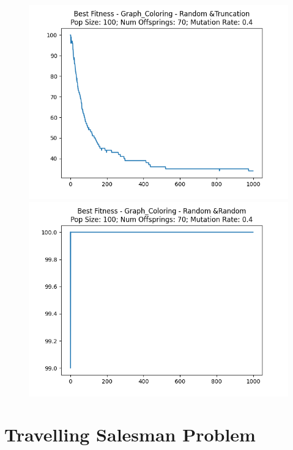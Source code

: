 \documentclass[12pt]{report}
\theoremstyle{mytheoremstyle}
\theoremstyle{mytheoremstyle}
\theoremstyle{myproblemstyle}
\begin{document}
\begin{figure}[!]
\begin{minipage}{0.4\textwidth}
		\includegraphics[width=\linewidth]{../Analysis/BSF_Graph_Coloring_4_3_100_70.png}
	\end{minipage}
	\hspace{\fill}
	\begin{minipage}{0.4\textwidth}
		\includegraphics[width=\linewidth]{../Analysis/BSF_Graph_Coloring_4_4_100_70.png}
	\end{minipage}
\end{figure}
\newpage

\section{Travelling Salesman Problem}
\end{document}
